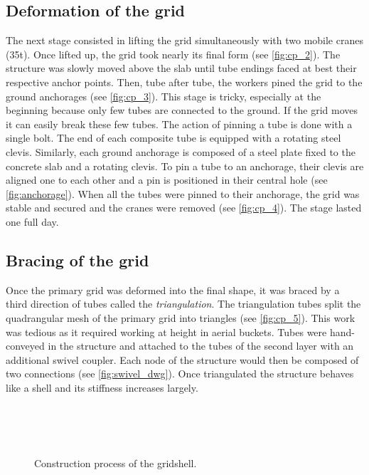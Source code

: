 \subsection{Deformation of the grid}
The next stage consisted in lifting the grid simultaneously with two mobile cranes (35t). Once lifted up, the grid took nearly its final form (see \cref{fig:cp_2}). The structure was slowly moved above the slab until tube endings faced at best their respective anchor points. Then, tube after tube, the workers pined the grid to the ground anchorages (see \cref{fig:cp_3}). This stage is tricky, especially at the beginning because only few tubes are connected to the ground. If the grid moves it can easily break these few tubes. The action of pinning a tube is done with a single bolt. The end of each composite tube is equipped with a rotating steel clevis. Similarly, each ground anchorage is composed of a steel plate fixed to the concrete slab and a rotating clevis. To pin a tube to an anchorage, their clevis are aligned one to each other and a pin is positioned in their central hole (see \cref{fig:anchorage}). When all the tubes were pinned to their anchorage, the grid was stable and secured and the cranes were removed (see \cref{fig:cp_4}). The stage lasted one full day.

\subsection{Bracing of the grid}
Once the primary grid was deformed into the final shape, it was braced by a third direction of tubes called the \emph{triangulation}. The triangulation tubes split the quadrangular mesh of the primary grid into triangles (see \cref{fig:cp_5}). This work was tedious as it required working at height in aerial buckets. Tubes were hand-conveyed in the structure and attached to the tubes of the second layer with an additional swivel coupler. Each node of the structure would then be composed of two connections (see \cref{fig:swivel_dwg}). Once triangulated the structure behaves like a shell and its stiffness increases largely.

\begin{figure}[p]
     	\centering
	\begin{fullpage}	
		\hspace*{\fill}
		 \\
		\hspace*{\fill}
		 \\
		\hspace*{\fill}
		 \\
		\vspace{10pt}
		\caption{Construction process of the gridshell.}
		\label{fig:erection}    
	\end{fullpage}
\end{figure}

